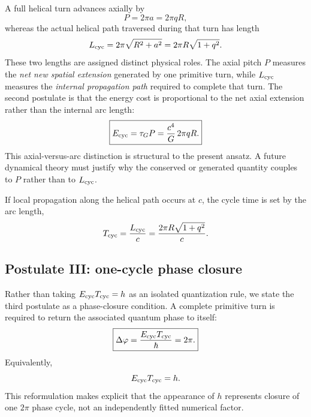 \documentclass[aps,prd,reprint,nofootinbib,floatfix]{revtex4-2}
\begin{document}
A full helical turn advances axially by
\begin{equation}
P=2\pi a=2\pi qR,
\label{eq:pitchcycle}
\end{equation}
whereas the actual helical path traversed during that turn has length
\begin{equation}
L_{\rm cyc}=2\pi\sqrt{R^2+a^2}
=2\pi R\sqrt{1+q^2}.
\label{eq:Lcycle}
\end{equation}
These two lengths are assigned distinct physical roles.  The axial pitch $P$ measures the \emph{net new spatial extension} generated by one primitive turn, while $L_{\rm cyc}$ measures the \emph{internal propagation path} required to complete that turn.  The second postulate is that the energy cost is proportional to the net axial extension rather than the internal arc length:
\begin{equation}
\boxed{E_{\rm cyc}=\tau_G P
=\frac{c^4}{G}\,2\pi qR.}
\label{eq:Ecycle}
\end{equation}
This axial-versus-arc distinction is structural to the present ansatz.  A future dynamical theory must justify why the conserved or generated quantity couples to $P$ rather than to $L_{\rm cyc}$.

If local propagation along the helical path occurs at $c$, the cycle time is set by the arc length,
\begin{equation}
T_{\rm cyc}=\frac{L_{\rm cyc}}{c}
=\frac{2\pi R\sqrt{1+q^2}}{c}.
\label{eq:Tcycle}
\end{equation}

\subsection{Postulate III: one-cycle phase closure}

Rather than taking $E_{\rm cyc}T_{\rm cyc}=h$ as an isolated quantization rule, we state the third postulate as a phase-closure condition.  A complete primitive turn is required to return the associated quantum phase to itself:
\begin{equation}
\boxed{\Delta\varphi
=\frac{E_{\rm cyc}T_{\rm cyc}}{\hbar}=2\pi.}
\label{eq:phaseclosure}
\end{equation}
Equivalently,
\begin{equation}
E_{\rm cyc}T_{\rm cyc}=h.
\label{eq:actionpostulate}
\end{equation}
This reformulation makes explicit that the appearance of $h$ represents closure of one $2\pi$ phase cycle, not an independently fitted numerical factor.
\end{document}
